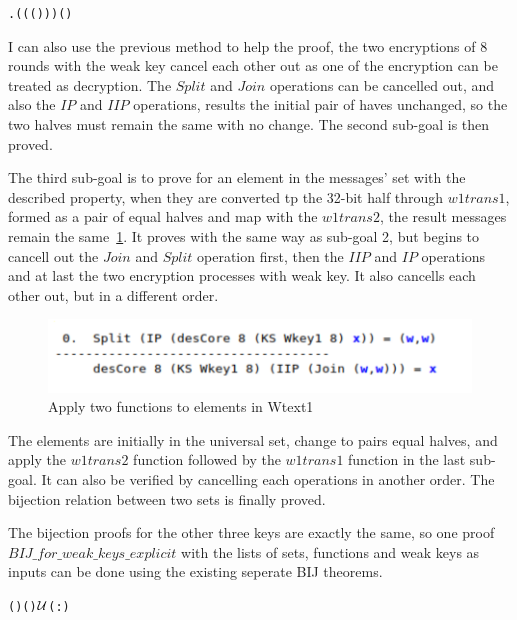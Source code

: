 \documentclass{article}
\begin{document}
\begin{alltt}
   \HOLTokenTurnstile{}  \HOLSymConst{=}
   \HOLTokenLeftbrace{} \HOLTokenBar{} \HOLSymConst{\HOLTokenExists{}}.  ( (  (  ) )) \HOLSymConst{=} (\HOLSymConst{,})\HOLTokenRightbrace{}
\end{alltt}

I can also use the previous method to help the proof, the two encryptions of 8 rounds with the weak key cancel each other out
as one of the encryption can be treated as decryption. The $Split$ and $Join$ operations can be cancelled out, and also the
$IP$ and $IIP$ operations, results the initial pair of haves unchanged, so the two halves must remain the same with no change.
The second sub-goal is then proved.

The third sub-goal is to prove for an element in the messages' set with the described property, when they are converted
tp the 32-bit half through $w1trans1$, formed as a pair of equal halves and map with the $w1trans2$, the result messages
remain the same~\ref{fig:form5}. It proves with the same way as sub-goal 2, but begins to cancell out the $Join$ and $Split$ operation first, then
the $IIP$ and $IP$ operations and at last the two encryption processes with weak key. It also cancells each other out,
but in a different order.

\begin{figure}
\centering
\includegraphics[width=0.25\linewidth]{BIJ}
\caption{\label{fig:form5} Apply two functions to elements in Wtext1}
\end{figure}

The elements are initially in the universal set, change to pairs equal halves, and apply the $w1trans2$ function followed
by the $w1trans1$ function in the last sub-goal. It can also be verified by cancelling each operations in another order.
The bijection relation between two sets is finally proved.

The bijection proofs for the other three keys are exactly the same, so one proof $BIJ\_for\_weak\_keys\_explicit$ with the lists of sets, functions and
weak keys as inputs can be done using the existing seperate BIJ theorems.

\begin{alltt}
   \HOLTokenTurnstile{}  \HOLSymConst{\HOLTokenLt{}}  \HOLSymConst{\HOLTokenImp{}}  (  ) (  ) \ensuremath{{\cal{U}}}(:)
\end{alltt}
\end{document}
